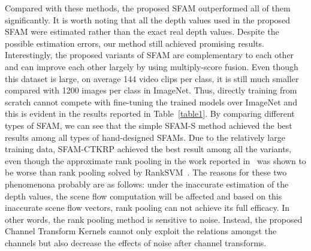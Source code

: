 \documentclass[10pt,twocolumn,letterpaper]{article}
\begin{document}
Compared with these methods, the proposed SFAM outperformed all of them 
significantly. It is worth noting that all the depth values used in the proposed SFAM were estimated 
rather than the exact real depth values. Despite the possible estimation 
errors, our method still achieved promising results.
Interestingly, the proposed variants of SFAM are complementary to each other and 
can improve each other largely by using multiply-score fusion.  Even though 
this dataset is large, on average  144 video clips per class, it is still much 
smaller compared with 1200 images per class in ImageNet. Thus, directly 
training from scratch cannot compete with fine-tuning the trained 
models over ImageNet and this is evident in the results reported in 
Table~\ref{table1}.
By comparing different types of SFAM, we can see that the simple SFAM-S method 
achieved the best results among all types of hand-designed SFAMs. Due to the 
relatively large training data, SFAM-CTKRP achieved the best result among all 
the variants, even though the approximate rank pooling in the 
work reported in~\cite{bilen2016dynamic} was shown to be worse than rank 
pooling solved by RankSVM~\cite{smola2004tutorial}. The reasons for these two 
phenomenona probably are as follows: under the inaccurate estimation of the 
depth values, the scene flow computation will be affected and based on this 
inaccurate scene flow vectors, rank pooling can not achieve its full efficacy. 
In other words, the rank pooling method is sensitive to noise. Instead, the 
proposed Channel Transform Kernels cannot only exploit the relations amongst 
the channels but also decrease the effects of noise after channel transforms. 
\end{document}
